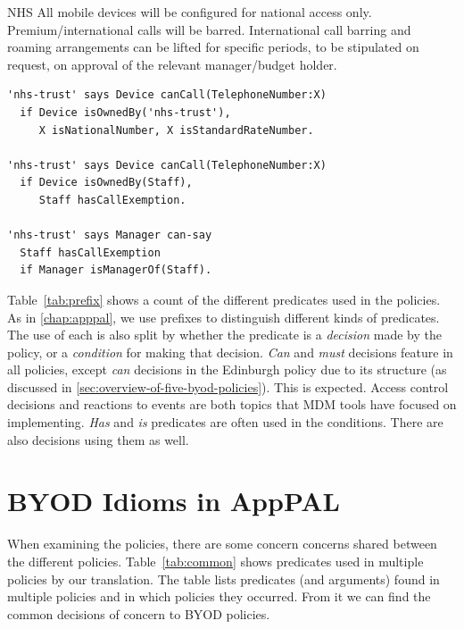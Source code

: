 \documentclass[thesis.tex]{subfiles}
\begin{document}
\noindent\begin{minipage}{\linewidth}
\begin{policyrule}{NHS}
  All mobile devices will be configured for national access only. Premium/international calls will be barred.
  International call barring and roaming arrangements can be lifted for specific periods, to be stipulated on request, on approval of the relevant manager/budget holder.
  \normalfont
  \begin{lstlisting}
'nhs-trust' says Device canCall(TelephoneNumber:X)
  if Device isOwnedBy('nhs-trust'),
     X isNationalNumber, X isStandardRateNumber.

'nhs-trust' says Device canCall(TelephoneNumber:X)
  if Device isOwnedBy(Staff),
     Staff hasCallExemption.

'nhs-trust' says Manager can-say
  Staff hasCallExemption
  if Manager isManagerOf(Staff).
  \end{lstlisting}
\end{policyrule}
\end{minipage}

Table~\ref{tab:prefix} shows a count of the different predicates used in the
policies. As in \autoref{chap:apppal}, we use prefixes to distinguish
different kinds of predicates. The use of each is also split by whether the
predicate is a \emph{decision} made by the policy, or a \emph{condition} for
making that decision. \emph{Can} and \emph{must} decisions feature in all
policies, except \emph{can} decisions in the Edinburgh policy due to
its structure (as discussed in
\autoref{sec:overview-of-five-byod-policies}). This is expected.
Access control decisions and reactions to events are both topics that
\ac{MDM} tools have focused on implementing. \emph{Has} and \emph{is} predicates
are often used in the conditions.  There are also decisions using them as well.

\section{BYOD Idioms in AppPAL}
\label{sec:common_concerns}

When examining the policies, there are some concern concerns shared between the
different policies. Table~\ref{tab:common} shows predicates used in multiple
policies by our translation. The table lists predicates (and arguments) found in
multiple policies and in which policies they occurred. From it we can find
the common decisions of concern to \ac{BYOD} policies.
\end{document}
